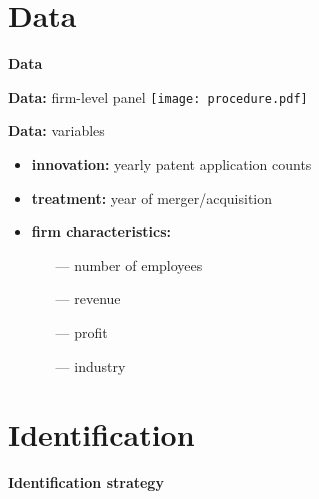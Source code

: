 \documentclass{beamer} %
\begin{document}
\section{Data}
{
	\begin{frame}[plain]		
	\vspace{1cm}
	{\color{white}\LARGE \textbf{Data}}
\end{frame}
}


\begin{frame}{\textbf{Data:} firm-level panel}
\centering\texttt{[image: procedure.pdf]}
\end{frame}

\begin{frame}{\textbf{Data:} variables}
	\begin{itemize}
		\item \textbf{innovation:} yearly patent application counts
		\vspace{.4cm}
		\item \textbf{treatment:} year of merger/acquisition
		\vspace{.4cm}
		\item \textbf{firm characteristics:}
		\begin{itemize}
			\item[---] number of employees
			\item[---] revenue
			\item[---] profit
			\item[---] industry
		\end{itemize}
	\end{itemize}
\end{frame}


\section{Identification}
{
	\begin{frame}[plain]		
		\vspace{1cm}
		{\color{white}\LARGE \textbf{Identification strategy}}
	\end{frame}
}
\end{document}
